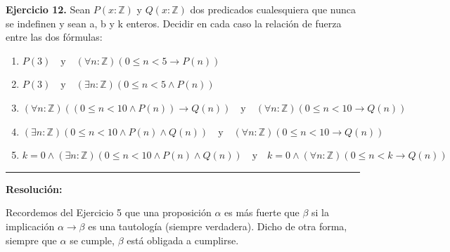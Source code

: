 \hypertarget{ej12}{}
\noindent \textbf{Ejercicio 12.} Sean $P(x:\mathbb{Z})$ y $Q(x:\mathbb{Z})$ dos predicados cualesquiera que nunca se indefinen y sean a, b y k enteros. Decidir en cada caso la relación de fuerza entre las dos fórmulas:

\begin{enumerate}[label=\alph*)]
    \item $P(3) \quad \text{y} \quad (\forall n: \mathbb{Z}) (0 \leq n < 5 \rightarrow P(n))$
    \item $P(3) \quad \text{y} \quad (\exists n: \mathbb{Z}) (0 \leq n < 5 \wedge P(n))$
    \item $(\forall n:\mathbb{Z})((0 \leq n < 10 \wedge P(n)) \rightarrow Q(n)) \quad \text{y} \quad (\forall n: \mathbb{Z}) (0 \leq n < 10 \rightarrow Q(n))$
    \item $(\exists n:\mathbb{Z})(0 \leq n < 10 \wedge P(n) \wedge Q(n)) \quad \text{y} \quad (\forall n: \mathbb{Z}) (0 \leq n < 10 \rightarrow Q(n))$
    \item $k=0 \wedge (\exists n:\mathbb{Z})(0 \leq n < 10 \wedge P(n) \wedge Q(n)) \quad \text{y} \quad k=0 \wedge (\forall n:\mathbb{Z})(0 \leq n < k \rightarrow Q(n))$
\end{enumerate}

\vspace{0.2cm}
{\color{gray}\hrule}
\vspace{0.4cm}

\textbf{Resolución:}

Recordemos del Ejercicio 5 que una proposición $\alpha$ es más fuerte que $\beta$ si la implicación $\alpha \rightarrow \beta$ es una tautología (siempre verdadera). Dicho de otra forma, siempre que $\alpha$ se cumple, $\beta$ está obligada a cumplirse.

